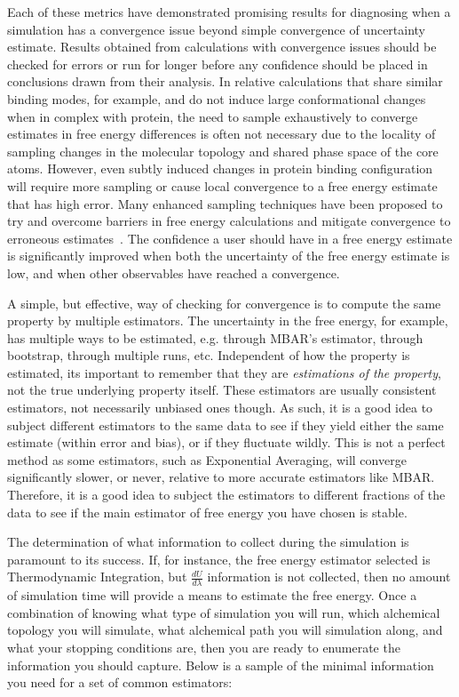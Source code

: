 \documentclass[9pt,bestpractices]{livecoms}
\begin{document}
Each of these metrics have demonstrated promising results for diagnosing when a simulation has a convergence issue beyond simple convergence of uncertainty estimate. 
Results obtained from calculations with convergence issues should be checked for errors or run for longer before any confidence should be placed in conclusions drawn from their analysis.
In relative calculations that share similar binding modes, for example, and do not induce large conformational changes when in complex with protein, the need to sample exhaustively to converge estimates in free energy differences is often not necessary due to the locality of sampling changes in the molecular topology and shared phase space of the core atoms.
However, even subtly induced changes in protein binding configuration will require more sampling or cause local convergence to a free energy estimate that has high error.
Many enhanced sampling techniques have been proposed to try and overcome barriers in free energy calculations and mitigate convergence to erroneous estimates~\cite{}. 
The confidence a user should have in a free energy estimate is significantly improved when both the uncertainty of the free energy estimate is low, and when other observables have reached a convergence.

A simple, but effective, way of checking for convergence is to compute the same property by multiple estimators. 
The uncertainty in the free energy, for example, has multiple ways to be estimated, e.g. through MBAR's estimator, through bootstrap, through multiple runs, etc. 
Independent of how the property is estimated, its important to remember that they are \textit{estimations of the property}, not the true underlying property itself. 
These estimators are usually consistent estimators, not necessarily unbiased ones though.
As such, it is a good idea to subject different estimators to the same data to see if they yield either the same estimate (within error and bias), or if they fluctuate wildly. 
This is not a perfect method as some estimators, such as Exponential Averaging, will converge significantly slower, or never, relative to more accurate estimators like MBAR. 
Therefore, it is a good idea to subject the estimators to different fractions of the data to see if the main estimator of free energy you have chosen is stable.


The determination of what information to collect during the simulation is paramount to its success. If, for instance, the free energy estimator selected is Thermodynamic Integration, but $\frac{dU}{d\lambda}$ information is not collected, then no amount of simulation time will provide a means to estimate the free energy. Once a combination of knowing what type of simulation you will run, which alchemical topology you will simulate, what alchemical path you will simulation along, and what your stopping conditions are, then you are ready to enumerate the information you should capture. Below is a sample of the minimal information you need for a set of common estimators:
\end{document}

